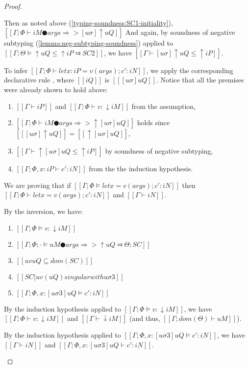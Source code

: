 \begin{proof}
\begin{caseof}
            Then as noted above (\ref{typing-soundness:SC1-initiality}),
            $[[ Γ ; Φ ⊢ iM ● args ⇒> [uσ]↑uQ ]]$
            And again, by soundness of negative subtyping (\cref{lemma:neg-subtyping-soundness})
            applied to $[[Γ; Θ ⊨ ↑uQ ≤ ↑iP ⫤ SC2]]$,
            we have
            $[[Γ ⊢ [uσ]↑uQ ≤ ↑iP]]$.

            To infer $[[Γ ; Φ ⊢ let x : iP = v(args); c' : iN ]]$,
            we apply the corresponding declarative rule , where
            $[[iQ]]$ is $[[ [uσ]uQ  ]]$. Notice that all the premises were already shown to
            hold above:
            \begin{enumerate}
                \item $[[Γ ⊢ iP]]$ and $[[Γ; Φ ⊢ v : ↓iM]]$ from the assumption,
                \item $[[Γ; Φ ⊢ iM ● args ⇒> ↑[uσ]uQ]]$ holds since $[[ [uσ]↑uQ ]] = [[ ↑[uσ]uQ ]]$,
                \item $[[Γ ⊢ ↑[uσ]uQ ≤ ↑iP]]$ by soundness of negative subtyping,
                \item $[[Γ; Φ, x:iP ⊢ c' : iN]]$ from the the induction hypothesis.
            \end{enumerate}

        \item {}
            We are proving that if
            $[[Γ; Φ ⊨ let x = v(args); c' : iN]]$
            then
            $[[Γ ; Φ ⊢ let x = v(args); c' : iN]]$ and
            $[[Γ ⊢ iN]]$.

            By the inversion, we have:
            \begin{enumerate}
                \item $[[Γ; Φ ⊨ v : ↓iM]]$ 
                \item $[[Γ ; Φ ; · ⊨ uM ● args ⇒> ↑uQ ⫤ Θ; SC]]$
                \item $[[uv uQ ⊆ dom(SC)]]$
                \item $[[SC|uv(uQ) singular with uσ3]]$
                \item $[[Γ; Φ, x:[uσ3]uQ ⊨ c' : iN]]$
            \end{enumerate}

            By the induction hypothesis applied to $[[Γ; Φ ⊨ v : ↓iM]]$, we have    
            $[[Γ; Φ ⊢ v : ↓iM]]$ and $[[Γ ⊢ ↓iM]]$ (and thus, $[[Γ ; dom(Θ) ⊢  uM]]$).
       
            By the induction hypothesis applied to $[[Γ; Φ, x:[uσ3]uQ ⊨ c' : iN]]$, we have
            $[[Γ ⊢ iN]]$ and $[[Γ; Φ, x:[uσ3]uQ ⊢ c' : iN]]$.


\end{caseof}
\end{proof}
